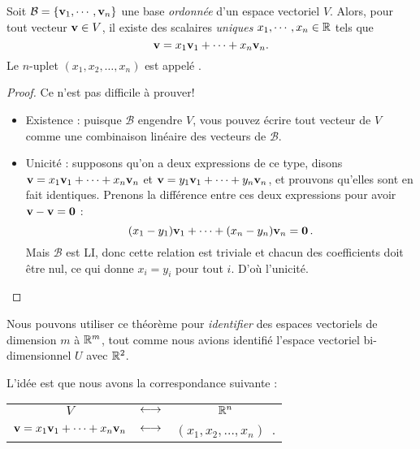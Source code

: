 \begin{theorem}[Coordonnées]
Soit $\mathcal B = \{\mathbf{v}_1,\cdots, \mathbf{v}_n\}$ une base {\it ordonnée} d'un espace vectoriel $V$.  Alors, pour tout vecteur $\mathbf{v} \in V$, il existe des scalaires  \emph{uniques} $x_1, \cdots, x_n \in \mathbb{R}$ tels que 
$$
\mathbf{v} = x_1\mathbf{v}_1 + \cdots + x_n\mathbf{v}_n.
$$
Le $n$-uplet $(x_1,x_2, \ldots, x_n)$ est appelé .
\end{theorem}

\begin{proof}
Ce n'est pas difficile à prouver!  
\begin{itemize}
	\item Existence : puisque $\mathcal B$ engendre $V$, vous pouvez 
écrire tout vecteur de $V$ comme une combinaison linéaire des vecteurs de $\mathcal B$. 
	\item Unicité : supposons qu'on a deux expressions de ce type, disons $\mathbf{v} = x_1\mathbf{v}_1 + \cdots + x_n\mathbf{v}_n$ et $\mathbf{v} = y_1\mathbf{v}_1 + \cdots + y_n\mathbf{v}_n$, et prouvons qu'elles sont en fait identiques.
Prenons la diff\'erence entre ces deux expressions pour avoir $\mathbf{v}-\mathbf{v} = \mathbf{0}$ :
$$
(x_1-y_1)\mathbf{v}_1 + \cdots + (x_n-y_n)\mathbf{v}_n = \mathbf{0}\,.
$$
Mais $\mathcal B$ est LI, donc cette relation est triviale et chacun des coefficients doit être nul, ce qui
donne $x_i = y_i$ pour tout $i$.  D'o\`u l'unicité.
\end{itemize}
\end{proof}

Nous pouvons utiliser ce théorème pour \emph{identifier} des espaces vectoriels de dimension $m$ à $\mathbb{R}^m$, 
tout comme nous avions identifié l'espace vectoriel bi-dimensionnel $U$ avec $\mathbb{R}^2$.

L'idée est que nous avons la correspondance suivante :

\begin{center}
\begin{tabular}{ccc}
$V$ &$\leftarrow \kern-.1em\rightarrow$ &$\mathbb{R}^n$ \\ 
$\mathbf{v} = x_1\mathbf{v}_1 + \cdots + x_n\mathbf{v}_n$ & $\leftarrow \kern-.1em\rightarrow$ & $(x_1,x_2, \ldots, x_n)$ \,.
\end{tabular}
\end{center}

